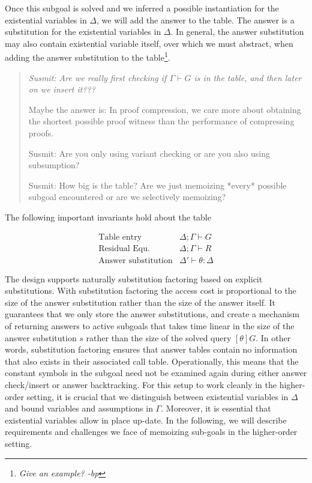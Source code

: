 \documentclass{acmconf}
\newcommand{\vd}{\vdash}
\newcommand{\ednote}[1]{\footnote{\it #1}}
\newenvironment{note}{\begin{quote}\message{note!}\it}{\end{quote}}
\begin{document}
Once this subgoal is solved and we inferred a possible instantiation for
the existential variables in $\Delta$, we will add the answer to the
table. The answer is a substitution for the existential variables in
$\Delta$. In general, the
answer substitution may also contain existential variable itself, over
which we must abstract, when adding the answer substitution to the
table\ednote{Give an example? -bp}.

\begin{note}
  Susmit: Are we really first checking if $\Gamma \vd G$ is in the
  table, and then later on we insert it???
  
   Maybe the answer is: In proof compression, we care more about obtaining the shortest
possible proof witness than the performance of compressing proofs.

  Susmit: Are you only using variant checking or are you also using
  subsumption?

  Susmit: How big is the table? Are we just memoizing *every* possible
  subgoal encountered or are we selectively memoizing?
\end{note}

The following important invariants hold about the table

\[
\begin{array}{ll}
\mbox{Table entry} & \Delta ; \Gamma \vd G\\
\mbox{Residual Equ.} & \Delta ; \Gamma \vd R \\
\mbox{Answer substitution} & \Delta' \vd \theta : \Delta
\end{array}
\]

The design supports naturally substitution factoring based on explicit
substitutions\cite{RamakrishnanJLP99}. With substitution factoring the
access cost is proportional to the size of the answer substitution
rather than the size of the answer itself. It guarantees that we only
store the answer substitutions, and create a mechanism of returning
answers to active subgoals that takes time linear in the size of the
answer substitution $s$ rather than the size of the solved query
$[\theta]G$. In other words, substitution factoring ensures that answer
tables contain no information that also exists in their associated
call table. Operationally, this means that the constant symbols in the
subgoal need not be examined again during either answer check/insert
or answer backtracking. For this setup to work
cleanly in the higher-order setting, it is crucial that we distinguish
between existential variables in $\Delta$ and bound variables and
assumptions in $\Gamma$. Moreover, it is essential that existential
variables allow in place up-date.  In the following, we will describe
requirements and challenges we face of memoizing sub-goals in the
higher-order setting. 
\end{document}

